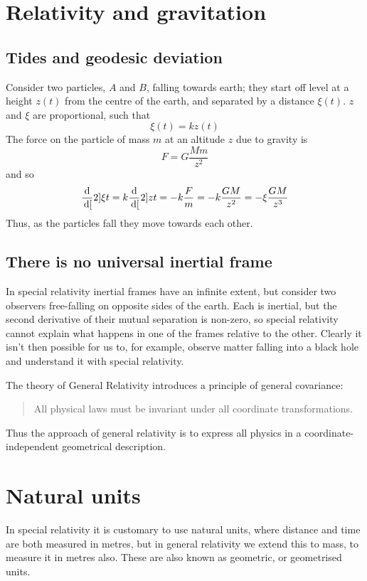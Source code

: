 \section{Relativity and gravitation}
\label{sec:relat-grav}

\subsection{Tides and geodesic deviation}
\label{sec:tides-geod-devi}

Consider two particles, $A$ and $B$, falling towards earth; they start
off level at a height $z(t)$ from the centre of the earth, and
separated by a distance $\xi(t)$. $z$ and $\xi$ are proportional, such
that
\[ \xi(t) = k z(t) \] The force on the particle of mass $m$ at an
altitude $z$ due to gravity is
\begin{equation}
  \label{eq:74}
  F = G \frac{M m }{z^2}
\end{equation}
and so
\begin{equation}
  \label{eq:75}
  \frac{\mathrm{d}}{\,\mathrm{d} [}2]{\xi}{t} = k \frac{\mathrm{d}}{\,\mathrm{d} [}2]{z}{t} = -k \frac{F}{m} = -k \frac{GM}{z^2} = - \xi \frac{GM}{z^3}
\end{equation}
Thus, as the particles fall they move towards each other.

\subsection{There is no universal inertial frame}
\label{sec:there-no-universal}

In special relativity inertial frames have an infinite extent, but
consider two observers free-falling on opposite sides of the
earth. Each is inertial, but the second derivative of their mutual
separation is non-zero, so special relativity cannot explain what
happens in one of the frames relative to the other. Clearly it isn't
then possible for us to, for example, observe matter falling into a
black hole and understand it with special relativity.


The theory of General Relativity introduces a principle of general
covariance:
\begin{quotation}
  All physical laws must be invariant under all coordinate
  transformations.
\end{quotation}
Thus the approach of general relativity is to express all physics in a
coordinate-independent geometrical description.

\section{Natural units}
\label{sec:natural-units}

In special relativity it is customary to use natural units, where
distance and time are both measured in metres, but in general
relativity we extend this to mass, to measure it in metres also. These
are also known as geometric, or geometrised units.



